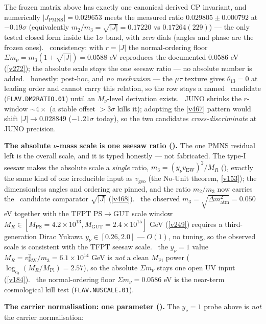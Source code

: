 \documentclass[11pt,a4paper]{article}
\newcommand{\Mpl}{M_{\mathrm{Pl}}}
\theoremstyle{definition}
\begin{document}
The frozen matrix above has exactly one canonical derived CP invariant, and numerically
$|J_{\mathrm{PMNS}}|=0.029653$ meets the measured ratio $0.029805\pm0.000792$ at $-0.19\sigma$ (equivalently
$m_2/m_3=\sqrt{|J|}=0.17220$ vs $0.17264(229)$) --- the only tested closed form inside the $1\sigma$ band, with
\emph{zero} dials (angles and phase are the frozen ones). \mC\ consistency: with $r=|J|$ the normal-ordering floor
$\Sigma m_\nu=m_3(1+\sqrt{|J|})=0.0588$ eV reproduces the documented $0.0586$ eV (\vref{v272}); the absolute scale
stays the one seesaw ratio --- no absolute number is added. \mO\ honestly: post-hoc, and \emph{no mechanism} --- the
$\mu\tau$ texture gives $\theta_{13}=0$ at leading order and cannot carry this relation, so the row stays a named
\mO\ candidate (\texttt{FLAV.DM2RATIO.01}) until an $M_\nu$-level derivation exists. \mX\ JUNO shrinks the
$r$-window ${\sim}4\times$ (a stable offset $>3\sigma$ kills it); adopting the \vref{v467} pattern would shift
$|J|\to0.028849$ ($-1.21\sigma$ today), so the two candidates \emph{cross-discriminate} at JUNO precision.
\par\smallskip\noindent\textbf{The absolute $\nu$-mass scale is one seesaw ratio ().}
The one PMNS residual left is the overall scale, and it is typed honestly --- not fabricated. The type-I seesaw
makes the absolute scale a \emph{single} ratio, $m_3=(y_\nu v_{\mathrm{EW}})^2/M_R$ (\mE), exactly the same kind of
one irreducible input as $v_{\mathrm{geo}}$ (the No-Unit theorem, \vref{v153}); the dimensionless angles and ordering
are pinned, and the ratio $m_2/m_3$ now carries the \mO\ candidate comparator $\sqrt{|J|}$ (\vref{v468}). \mC\ the observed $m_3=\sqrt{\Delta m^2_{\mathrm{atm}}}
=0.050$ eV together with the TFPT PS$\to$GUT scale window $M_R\in[M_{\mathrm{PS}}{=}4.2{\times}10^{13},
M_{\mathrm{GUT}}{=}2.4{\times}10^{15}]$ GeV (\vref{v249}) requires a third-generation Dirac Yukawa
$y_\nu\in[0.26,2.0]$ --- $O(1)$, no tuning, so the observed scale is consistent with the TFPT seesaw scale.
\mO\ the $y_\nu{=}1$ value $M_R=v_{\mathrm{EW}}^2/m_3=6.1{\times}10^{14}$ GeV is \emph{not} a clean $\Mpl$ power
($\log_{c_3}(M_R/\Mpl)=2.57$), so the absolute $\Sigma m_\nu$ stays one open UV input (\vref{v184}). \mX\ the
normal-ordering floor $\Sigma m_\nu=0.0586$ eV is the near-term cosmological kill test (\texttt{FLAV.NUSCALE.01}).
\par\smallskip\noindent\textbf{The carrier normalisation: one parameter
().} The $y_\nu{=}1$ probe above is \emph{not} the carrier normalisation:
\end{document}
